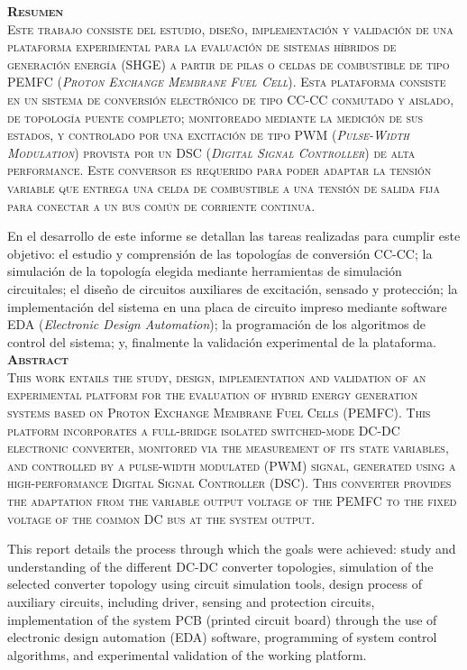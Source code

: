 \huge
\scshape
\textbf{Resumen}\\

\normalfont\normalsize
Este trabajo consiste del estudio, diseño, implementación y validación de una plataforma experimental para la evaluación de sistemas híbridos de generación energía (SHGE) a partir de pilas o celdas de combustible de tipo PEMFC (\textit{Proton Exchange Membrane Fuel Cell}). Esta plataforma consiste en un sistema de conversión electrónico de tipo CC-CC conmutado y aislado, de topología puente completo; monitoreado mediante la medición de sus estados, y controlado por una excitación de tipo PWM (\textit{Pulse-Width Modulation}) provista por un DSC (\textit{Digital Signal Controller}) de alta performance. Este conversor es requerido para poder adaptar la tensión variable que entrega una celda de combustible a una tensión de salida fija para conectar a un bus común de corriente continua. 

En el desarrollo de este informe se detallan las tareas realizadas para cumplir este objetivo: el estudio y comprensión de las topologías de conversión CC-CC; la simulación de la topología elegida mediante herramientas de simulación circuitales; el diseño de circuitos auxiliares de excitación, sensado y protección; la implementación del sistema en una placa de circuito impreso mediante software EDA (\textit{Electronic Design Automation}); la programación de los algoritmos de control del sistema; y, finalmente la validación experimental de la plataforma.\\

\vspace{1cm}
\huge
\scshape
\textbf{Abstract}\\

\normalsize\normalfont
This work entails the study, design, implementation and validation of an experimental platform for the evaluation of hybrid energy generation systems based on Proton Exchange Membrane Fuel Cells (PEMFC). This platform incorporates a full-bridge isolated switched-mode DC-DC electronic converter, monitored via the measurement of its state variables, and controlled by a pulse-width modulated (PWM) signal, generated using a high-performance Digital Signal Controller (DSC). This converter provides the adaptation from the variable output voltage of the PEMFC to the fixed voltage of the common DC bus at the system output.

This report details the process through which the goals were achieved: study and understanding of the different DC-DC converter topologies, simulation of the selected converter topology using circuit simulation tools, design process of auxiliary circuits, including driver, sensing and protection circuits,  implementation of the system PCB (printed circuit board) through the use of electronic design automation (EDA) software, programming of system control algorithms, and experimental validation of the working platform.\\ 